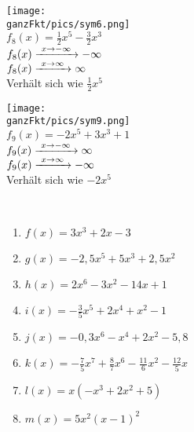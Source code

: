 \begin{minipage}{\textwidth}
\begin{minipage}{0.32\textwidth}
	\end{minipage}
	\begin{minipage}{0.32\textwidth}\centering
		\texttt{[image: \\ganzFkt/pics/sym6.png]}\\
		\(f_8(x)=\frac{1}{2}x^5-\frac{3}{2}x^3\)\\
		\textcolor{loes}{\(f_8(x)\xrightarrow{\hphantom{\ }x\to-\infty\hphantom{\ }}-\infty\)\\
			\(f_8(x)\xrightarrow{\hphantom{\ }x\to\infty\hphantom{\ }}\infty\)}\\
		\textcolor{loes}{Verhält sich wie \(\frac{1}{2}x^5\)}
	\end{minipage}
	\begin{minipage}{0.32\textwidth}\centering
		\texttt{[image: \\ganzFkt/pics/sym9.png]}\\
		\(f_9(x)=-2x^5+3x^3+1\)\\
		\textcolor{loes}{\(f_9(x)\xrightarrow{\hphantom{\ }x\to-\infty\hphantom{\ }}\infty\)\\
			\(f_9(x)\xrightarrow{\hphantom{\ }x\to\infty\hphantom{\ }}-\infty\)}\\
		\textcolor{loes}{Verhält sich wie \(-2x^5\)}
	\end{minipage}
\end{minipage}
\begin{Exercise}[title={Gib das Verhalten für \(x\to \pm \infty \) an}, label=ganzVerA1]\\
	\begin{minipage}{\textwidth}
		\begin{minipage}{0.49\textwidth}
			\begin{enumerate}[label=\alph*)]
				\item \(f(x)=3x^3+2x-3\)
				\item \(g(x)=-2,5x^5+5x^3+2,5x^2\)
				\item \(h(x)=2x^6-3x^2-14x+1\)
				\item \(i(x)=-\frac{3}{5}x^5+2x^4+x^2-1\)
			\end{enumerate}
		\end{minipage}
		\begin{minipage}{0.49\textwidth}
			\begin{enumerate}[label=\alph*)]
				\setcounter{enumi}{4}
				\item \(j(x)=-0,3x^6-x^4+2x^2-5,8\)
				\item \(k(x)=-\frac{7}{5}x^7+\frac{8}{7}x^6-\frac{11}{6}x^2-\frac{12}{5}x\)
				\item \(l(x)=x\left(-x^3+2x^2+5\right)\)
				\item \(m(x)=5x^2\left(x-1\right)^2\)
			\end{enumerate}
		\end{minipage}
	\end{minipage}
\end{Exercise}
